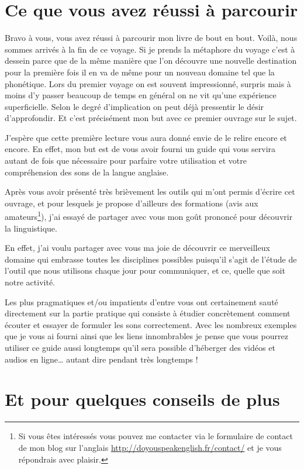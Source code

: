 \chapter{Ce que vous avez réussi à parcourir}\label{chap:success}

Bravo à vous, vous avez réussi à parcourir mon livre de bout en
bout. Voilà, nous sommes arrivés à la fin de ce voyage. Si je prends
la métaphore du voyage c'est à dessein parce que de la même manière
que l'on découvre une nouvelle destination pour la première fois il en
va de même pour un nouveau domaine tel que la phonétique. Lors du
premier voyage on est souvent impressionné, surpris mais à moins d'y
passer beaucoup de temps en général on ne vit qu'une expérience
superficielle. Selon le degré d'implication on peut déjà pressentir le
désir d'approfondir. Et c'est précisément mon but avec ce premier
ouvrage sur le sujet.

J'espère que cette première lecture vous aura donné envie de le relire
encore et encore. En effet, mon but est de vous avoir fourni un guide
qui vous servira autant de fois que nécessaire pour parfaire votre
utilisation et votre compréhension des sons de la langue anglaise.

Après vous avoir présenté très brièvement les outils qui m'ont permis
d'écrire cet ouvrage, et pour lesquels je propose d'ailleurs des
formations (avis aux amateurs\footnote{Si vous êtes intéressés vous
  pouvez me contacter via le formulaire de contact de mon blog sur
  l'anglais \url{http://doyouspeakenglish.fr/contact/} et je vous
  répondrais avec plaisir.}), j'ai essayé de partager avec vous mon
goût prononcé pour découvrir la linguistique.

En effet, j'ai voulu partager avec vous ma joie de découvrir ce
merveilleux domaine qui embrasse toutes les disciplines possibles
puisqu'il s'agit de l'étude de l'outil que nous utilisons chaque jour
pour communiquer, et ce, quelle que soit notre activité.

Les plus pragmatiques et/ou impatients d'entre vous ont certainement
sauté directement sur la partie pratique qui consiste à étudier
concrètement comment écouter et essayer de formuler les sons
correctement. Avec les nombreux exemples que je vous ai fourni ainsi
que les liens innombrables je pense que vous pourrez utiliser ce guide
aussi longtemps qu'il sera possible d'héberger des vidéos et audios en
ligne\dots{} autant dire pendant très longtemps !

\chapter{Et pour quelques conseils de plus}\label{chap:conseils}


